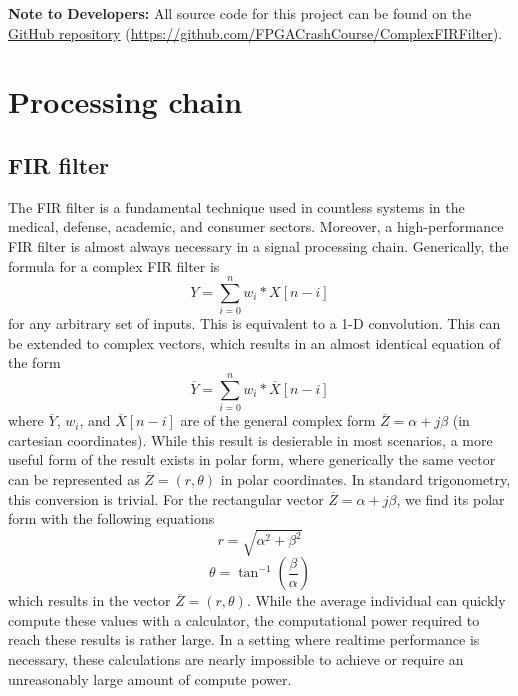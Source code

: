 \documentclass[11pt]{report}
\begin{document}
\vspace{1em}

\colorbox{red!15}{\parbox{\linewidth}{\noindent\textbf{Note to Developers:} All source code for this project can be found on the \href{https://github.com/FPGACrashCourse/ComplexFIRFilter}{GitHub repository} (\href{https://github.com/FPGACrashCourse/ComplexFIRFilter}{https://github.com/FPGACrashCourse/ComplexFIRFilter}).}}

\section{Processing chain}
\subsection{FIR filter}\label{FIRtheory}

The FIR filter is a fundamental technique used in countless systems in the medical, defense, academic, and consumer sectors. Moreover, a high-performance FIR filter is almost always necessary in a signal processing chain. Generically, the formula for a complex FIR filter is
\begin{equation}
    Y = \sum_{i=0}^{n}w_i * X[n - i]
\end{equation}
for any arbitrary set of inputs. This is equivalent to a 1-D convolution. This can be extended to complex vectors, which results in an almost identical equation of the form
\begin{equation}
	\overline{Y} = \sum_{i=0}^{n} w_i * \overline{X}[n-i]
\end{equation}
where $\overline{Y}$, $w_i$, and $\overline{X}[n-i]$ are of the general complex form $\overline{Z} = \alpha + j \beta$ (in cartesian coordinates). While this result is desierable in most scenarios, a more useful form of the result exists in polar form, where generically the same vector can be represented as $\overline{Z} = (r, \theta)$ in polar coordinates. In standard trigonometry, this conversion is trivial. For the rectangular vector $\overline{Z} = \alpha + j \beta$, we find its polar form with the following equations
\begin{equation}
	r = \sqrt{\alpha^2 + \beta^2}
\end{equation}
\begin{equation}
	\theta = \tan^{-1}\left({\frac{\beta}{\alpha}}\right)
\end{equation}
which results in the vector $\overline{Z} = (r, \theta)$. While the average individual can quickly compute these values with a calculator, the computational power required to reach these results is rather large. In a setting where realtime performance is necessary, these calculations are nearly impossible to achieve or require an unreasonably large amount of compute power.
\end{document}
